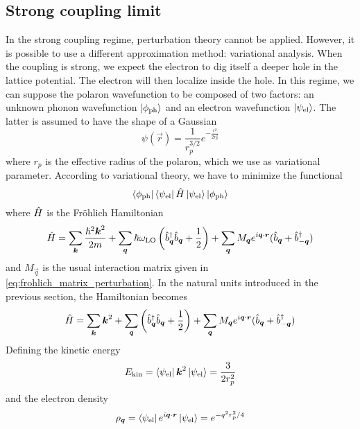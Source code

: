 \subsection{Strong coupling limit}
In the strong coupling regime, perturbation theory cannot be applied. However, it is possible to use a different approximation method: variational analysis. When the coupling is strong, we expect the electron to dig itself a deeper hole in the lattice potential. The electron will then localize inside the hole. In this regime, we can suppose the polaron wavefunction to be composed of two factors: an unknown phonon wavefunction $\ket{\phi_\text{ph}}$ and an electron wavefunction $\ket{\psi_\text{el}}$. The latter is assumed to have the shape of a Gaussian
\begin{equation}
    \psi(\vec{r}) = \frac{1}{r_p^{3/2}}e^{-\frac{r^2}{2r_p^2}}
\end{equation}
where $r_p$ is the effective radius of the polaron, which we use as variational parameter. According to variational theory, we have to minimize the functional
\begin{equation}
    \bra{\phi_\text{ph}} \bra{\psi_\text{el}} \hat{H} \ket{\psi_\text{el}} \ket{\phi_\text{ph}}
\end{equation}
where $\hat{H}$ is the Fröhlich Hamiltonian
\begin{equation}
    \hat{H} = \sum_{\mathbf{\boldsymbol{k}}} \frac{\hslash^2\mathbf{\boldsymbol{k}}^2}{2m}
    + \sum_{\mathbf{\boldsymbol{q}}} \hslash \omega_\text{LO} \left( \hat{b}^\dagger_{ \mathbf{\boldsymbol{q}}} \hat{b}_{ \mathbf{\boldsymbol{q}}} + \frac{1}{2} \right)
    + \sum_{\mathbf{\boldsymbol{q}}} M_{\mathbf{\boldsymbol{q}}} e^{i\mathbf{\boldsymbol{q}}\cdot\mathbf{\boldsymbol{r}}} (\hat{b}_{\mathbf{\boldsymbol{q}}} + \hat{b}^\dagger_{-\mathbf{\boldsymbol{q}}})
\end{equation}
and $M_\vec{q}$ is the usual interaction matrix given in \cref{eq:frohlich_matrix_perturbation}. In the natural units introduced in the previous section, the Hamiltonian becomes
\begin{equation}
    \hat{H} = \sum_{\mathbf{\boldsymbol{k}}} \mathbf{\boldsymbol{k}}^2
    + \sum_{\mathbf{\boldsymbol{q}}} \left( \hat{b}^\dagger_{ \mathbf{\boldsymbol{q}}} \hat{b}_{ \mathbf{\boldsymbol{q}}} + \frac{1}{2} \right)
    + \sum_{\mathbf{\boldsymbol{q}}} M_{\mathbf{\boldsymbol{q}}} e^{i\mathbf{\boldsymbol{q}}\cdot\mathbf{\boldsymbol{r}}} (\hat{b}_{\mathbf{\boldsymbol{q}}} + \hat{b}^\dagger_{-\mathbf{\boldsymbol{q}}})
\end{equation}
Defining the kinetic energy
\begin{equation} \label{eq:variational_kinetic}
    E_\text{kin} = \bra{\psi_\text{el}} \mathbf{\boldsymbol{k}}^2 \ket{\psi_\text{el}}  = \frac{3}{2r_p^2}
\end{equation}
and the electron density
\begin{equation} \label{eq:electron_density}
    \rho_{\mathbf{\boldsymbol{q}}} = \bra{\psi_\text{el}} e^{i\mathbf{\boldsymbol{q}}\cdot\mathbf{\boldsymbol{r}}} \ket{\psi_\text{el}} = e^{-q^2r_p^2/4}
\end{equation}

